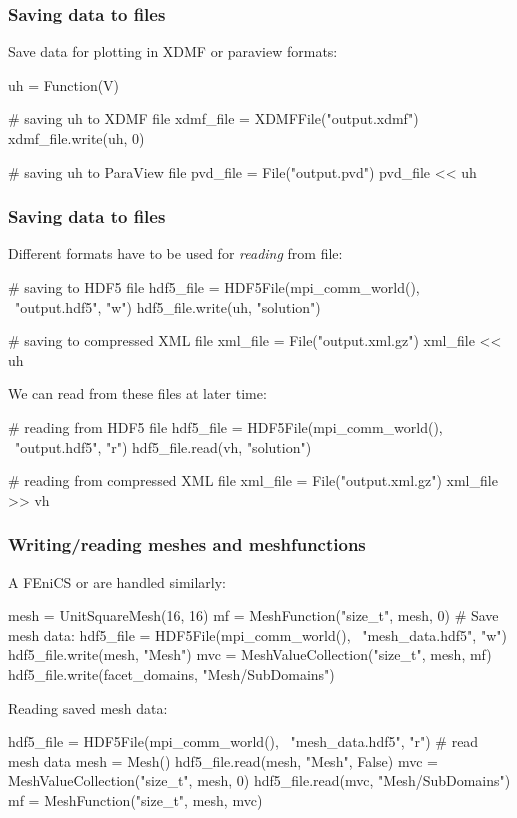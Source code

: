 \begin{frame}[fragile]
  \frametitle{Saving data to files}
  Save data for plotting in XDMF or paraview formats:
  \begin{python}
uh = Function(V)

# saving uh to XDMF file
xdmf_file = XDMFFile("output.xdmf")
xdmf_file.write(uh, 0)

# saving uh to ParaView file
pvd_file = File("output.pvd")
pvd_file << uh
  \end{python}

\end{frame}

\begin{frame}[fragile]
  \frametitle{Saving data to files}
  Different formats have to be used for \emph{reading} from file:
\vspace{-5mm}
  \begin{python}
# saving to HDF5 file
hdf5_file = HDF5File(mpi_comm_world(), \
                     "output.hdf5", "w")
hdf5_file.write(uh, "solution")

# saving to compressed XML file
xml_file = File("output.xml.gz")
xml_file << uh
  \end{python}
We can read from these files at later time:
\vspace{-5mm}
  \begin{python}
# reading from HDF5 file
hdf5_file = HDF5File(mpi_comm_world(), \
                     "output.hdf5", "r")
hdf5_file.read(vh, "solution")

# reading from compressed XML file
xml_file = File("output.xml.gz")
xml_file >> vh
  \end{python}

\end{frame}


\begin{frame}[fragile]
  \frametitle{Writing/reading meshes and meshfunctions}
  A FEniCS \pyth{Mesh} or  are handled similarly:
\vspace{-5mm}
  \begin{python}
mesh = UnitSquareMesh(16, 16)
mf = MeshFunction("size_t", mesh, 0)
# Save mesh data:
hdf5_file = HDF5File(mpi_comm_world(), \
                     "mesh_data.hdf5", "w")
hdf5_file.write(mesh, "Mesh")
mvc = MeshValueCollection("size_t", mesh, mf)
hdf5_file.write(facet_domains, "Mesh/SubDomains")
  \end{python}

Reading saved mesh data:
\vspace{-5mm}
  \begin{python}
hdf5_file = HDF5File(mpi_comm_world(), \
                     "mesh_data.hdf5", "r")
# read mesh data
mesh = Mesh()
hdf5_file.read(mesh, "Mesh", False)
mvc = MeshValueCollection("size_t", mesh, 0)
hdf5_file.read(mvc, "Mesh/SubDomains")
mf = MeshFunction("size_t", mesh, mvc)
  \end{python}
\end{frame}
